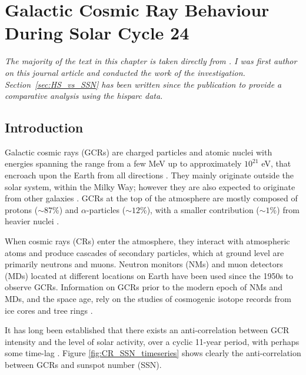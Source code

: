\chapter{Galactic Cosmic Ray Behaviour During Solar Cycle 24}\label{chap:GCR_SSN_24}


\textit{The majority of the text in this chapter is taken directly from \cite{ross_behaviour_2019}. I was first author on this journal article and conducted the work of the investigation. Section~\ref{sec:HS_vs_SSN} has been written since the publication to provide a comparative analysis using the \gls{hisparc} data.}%


\section{Introduction}
\label{S-Introduction} 

Galactic cosmic rays (GCRs) are charged particles and atomic nuclei with energies spanning the range from a few MeV up to approximately $10^{21}$ eV, that encroach upon the Earth from all directions  \citep{giacalone_energetic_2010}. They mainly originate outside the solar system, within the Milky Way; however they are also expected to originate from other galaxies \citep{aab_observation_2017}. GCRs at the top of the atmosphere are mostly composed of protons ($\sim87$\%) and $\alpha$-particles ($\sim12$\%), with a smaller contribution ($\sim1$\%) from heavier nuclei \citep{dunai_cosmic_2010}.

When cosmic rays (CRs) enter the atmosphere, they interact with atmospheric atoms and produce cascades of secondary particles, which at ground level are primarily neutrons and muons. Neutron monitors (NMs) and muon detectors (MDs) located at different locations on Earth have been used since the 1950s to observe GCRs. Information on GCRs prior to the modern epoch of NMs and MDs, and the space age, rely on the studies of cosmogenic isotope records from ice cores and tree rings \citep{owens_heliospheric_2013}.

It has long been established that there exists an anti-correlation between GCR intensity and the level of solar activity, over a cyclic 11-year period, with perhaps some time-lag  \citep{forbush_cosmic-ray_1958, parker_passage_1965, usoskin_correlative_1998, van_allen_modulation_2000}. Figure \ref{fig:CR_SSN_timeseries} shows clearly the anti-correlation between GCRs and sunspot number (SSN).



